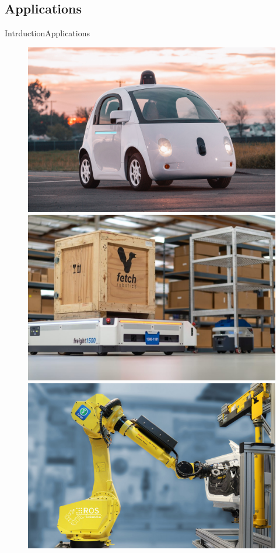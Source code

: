 \documentclass{beamer}
\begin{document}
\subsection{Applications}
\begin{frame}{Intrduction}{Applications}
\begin{figure}
\includegraphics[scale=0.05]{figs/img/selfdrivcar}
\includegraphics[scale=0.4]{figs/img/warehouse}
\includegraphics[scale=0.083]{figs/img/industrial}
\end{figure}

\end{frame}
\end{document}
